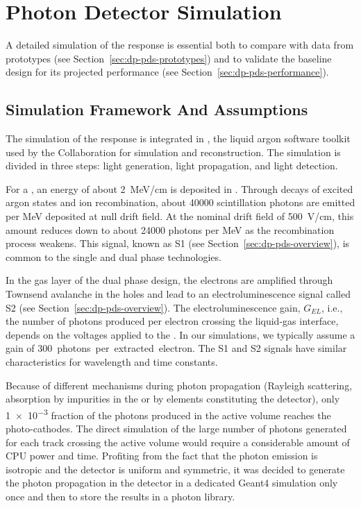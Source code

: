 \section{Photon Detector Simulation}
\label{sec:dp-pds-simulation}

A detailed simulation of the  response is essential both to compare with data from  prototypes (see Section~\ref{sec:dp-pds-prototypes}) and to validate the  baseline design for its projected performance (see Section~\ref{sec:dp-pds-performance}).


\subsection{Simulation Framework And Assumptions}
\label{subsec:dp-pds-simulation_assumptions}

The simulation of the  response is integrated in , the liquid argon software toolkit used by the \dune Collaboration for simulation and reconstruction. The simulation is divided in three steps: light generation, light propagation, and light detection.

For a , an energy of about \SI{2}{\MeV/\cm} is deposited in . Through decays of excited argon states and ion recombination, about \num{40000} scintillation photons are emitted per \si{\MeV} deposited at null drift field. At the nominal drift field of \SI{500}{\V/\cm}, this amount reduces down to about \num{24000} photons per \si{\MeV} as the recombination process weakens. This signal, known as S1 (see Section~\ref{sec:dp-pds-overview}), is common to the single and dual phase technologies.

In the gas layer of the dual phase design, the electrons are amplified through Townsend avalanche in the  holes and lead to an electroluminescence signal called S2 (see Section~\ref{sec:dp-pds-overview}). The electroluminescence gain, $G_{EL}$, i.e., the number of photons produced per electron crossing the liquid-gas interface, depends on the voltages applied to the . In our simulations, we typically assume a gain of \SI{300}{photons per extracted electron}. The S1 and S2 signals have similar characteristics for wavelength and time constants. 

Because of different mechanisms during photon propagation (Rayleigh scattering, absorption by impurities in the \lar or by elements constituting the detector), only \num{1e-3} fraction of the photons produced in the \lar active volume reaches the  photo-cathodes. The direct simulation of the large number of photons generated for each track crossing the active volume would require a considerable amount of CPU power and time. Profiting from the fact that the photon emission is isotropic and the detector is uniform and symmetric, it was decided to generate the photon propagation in the detector in a dedicated Geant4 simulation only once and then to store the results in a photon library.

